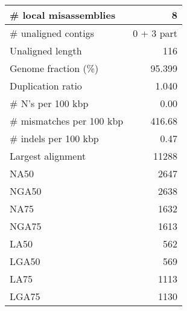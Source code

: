 \documentclass[12pt,a4paper]{article}
\begin{document}
\begin{table}[ht]
\begin{center}
\begin{tabular}{|l*{1}{|r}|}
\# local misassemblies & 8 \\ \hline
\# unaligned contigs & 0 + 3 part \\ \hline
Unaligned length & 116 \\ \hline
Genome fraction (\%) & 95.399 \\ \hline
Duplication ratio & 1.040 \\ \hline
\# N's per 100 kbp & 0.00 \\ \hline
\# mismatches per 100 kbp & 416.68 \\ \hline
\# indels per 100 kbp & 0.47 \\ \hline
Largest alignment & 11288 \\ \hline
NA50 & 2647 \\ \hline
NGA50 & 2638 \\ \hline
NA75 & 1632 \\ \hline
NGA75 & 1613 \\ \hline
LA50 & 562 \\ \hline
LGA50 & 569 \\ \hline
LA75 & 1113 \\ \hline
LGA75 & 1130 \\ \hline
\end{tabular}
\end{center}
\end{table}
\end{document}

